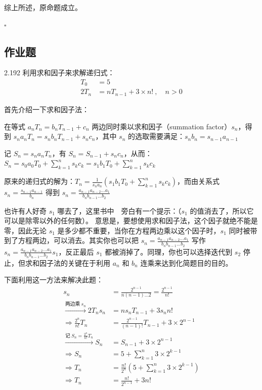 综上所述，原命题成立。

\hfill \( \square \)

\subsection{作业题}

\begin{problem}{2.19}{2}
  利用求和因子来求解递归式：
  \begin{align*}
    T_0 &= 5 \\
    2 T_n &= n T_{n-1} + 3 \times n! \ , \quad n > 0
  \end{align*}
\end{problem}

首先介绍一下求和因子法：

在等式 \( a_n T_n = b_n T_{n-1} + c_n \) 两边同时乘以求和因子（summation factor）\( s_n \)，得到 \( s_n a_n T_n = s_n b_n T_{n-1} + s_n c_n \)，其中 \( s_n \) 的选取需要满足：\( s_n b_n = s_{n-1} a_{n-1} \)

记 \( S_n = s_n a_n T_n \)，有 \( S_n = S_{n-1} + s_n c_n \)，从而：\( S_n = s_0 a_0 T_0 + \sum_{k=1}^n s_k c_k = s_1 b_1 T_0 + \sum_{k=1}^n s_k c_k \)

原来的递归式的解为：\( T_n = \frac{1}{s_n a_n} (s_1 b_1 T_0 + \sum_{k=1}^n s_k c_k) \)，而由关系式 \( s_n = \frac{s_{n-1} a_{n-1}}{b_n} \) 得到 \( s_n = \frac{a_{n-1} a_{n-2} \dots a_1}{b_n b_{n-1} \dots b_2} \)

也许有人好奇 \( s_1 \) 哪去了，这里书中~\cite{graham1994concrete}~旁白有一个提示：（\( s_1 \) 的值消去了，所以它可以是除零以外的任何数）。
意思是，要想使用求和因子法，这个因子就绝不能是零，因此无论 \( s_1 \) 是多少都不重要，当你在方程两边乘以这个因子时，\( s_1 \) 同时被带到了方程两边，可以消去。其实你也可以把 \( s_n = \frac{a_{n-1} a_{n-2} \dots a_1}{b_n b_{n-1} \dots b_2} \) 写作 \( s_n = \frac{a_{n-1} a_{n-2} \dots a_1}{b_n b_{n-1} \dots b_2} s_1 \)，反正最后 \( s_1 \) 都被消掉了。同理，你也可以选择迭代到 \( s_2 \) 停止，但求和因子法的关键在于利用 \( a_n \) 和 \( b_n \) 连乘来达到化简题目的目的。

下面利用这一方法来解决此题：
\begin{align*}
  s_n &= \frac{2^{n-1}}{n (n-1) \dots 2} = \frac{2^{n-1}}{n!} \\
  \xrightarrow{\text{两边乘} \ s_n} 2 T_n s_n &= n s_n T_{n-1} + 3 s_n n! \\
  \Rightarrow \frac{2^n}{n!} T_n &= \frac{2^{n-1}}{(n-1)!} T_{n-1} + 3 \times 2^{n-1} \\
  \xrightarrow{\text{记} \ S_n = \frac{2^n}{n!} T_n} S_n &= S_{n-1} + 3 \times 2^{n-1} \\
  \Rightarrow S_n &= 5 + \sum_{k=1}^n 3 \times 2^{k-1} \\
  \Rightarrow T_n &= \frac{n!}{2^n} (5 + \sum_{k=1}^n 3 \times 2^{k-1}) \\
  \Rightarrow T_n &= \frac{n!}{2^{n-1}} + 3 n!
\end{align*}

